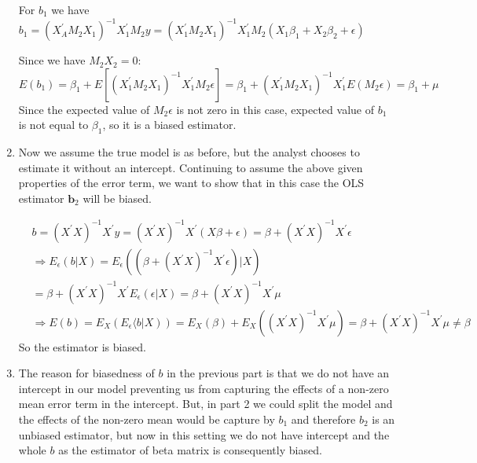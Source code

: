 \documentclass[11pt,reqno]{article}   %
\newcommand{\kt}{^{\prime}}
\begin{document}
\begin{enumerate}
For $b_1$ we have $b_{1}=\left(X_{A}^{\prime} M_{2} X_{1}\right)^{-1} X_{1}^{\prime} M_{2} y=\left(X_{1}^{\prime} M_{2} X_{1}\right)^{-1} X_{1}^{\prime} M_{2}\left(X_{1} \beta_{1}+X_{2} \beta_{2}+\epsilon\right)$

Since we have $M_2X_2=0$:
$$E\left(b_{1}\right)=\beta_{1}+E\left[\left(X_{1}^{\prime} M_{2} X_{1}\right)^{-1} X_{1}^{\prime} M_{2} \epsilon\right]=\beta_{1}+\left(X_{1}^{\prime} M_{2} X_{1}\right)^{-1} X_{1}^{\prime} E\left(M_{2} \epsilon\right) = \beta_1+\mu$$
Since the expected value of $M_2\epsilon$ is not zero in this case, expected value of $b_1$ is not equal to $\beta_1$, so it is a biased estimator.


\item
Now we assume the true model is as before, but the analyst chooses to estimate it without an intercept. Continuing to assume the above given properties of the error term, we want to show that in this case the OLS estimator $\mathbf{b}_{2}$ will be biased.

\begin{equation}
\begin{split}
&b=\left(X^{\prime} X\right)^{-1} X^{\prime} y=\left(X^{\prime} X\right)^{-1} X^{\prime}(X \beta+\epsilon)=\beta+\left(X^{\prime} X\right)^{-1} X^{\prime} \epsilon\\
&\Rightarrow E_{\epsilon}(b | X)=E_{\epsilon}\left(\left(\beta+\left(X^{\prime} X\right)^{-1} X^{\prime} \epsilon\right) | X\right)\\&=\beta+\left(X^{\prime} X\right)^{-1} X^{\prime} E_{\epsilon}(\epsilon | X)= 
\beta+\left(X^{\prime} X\right)^{-1} X^{\prime} \mu\\
&\left.\Rightarrow E(b)=E_{X}\left(E_{\epsilon}\langle b| X\right)\right)=E_{X}(\beta)+E_{X}\left(\left(X^{\prime} X\right)^{-1} X^{\prime} \mu\right)= \beta+(X\kt X)^{-1}X\kt\mu \neq \beta
\end{split}
\end{equation}
So the estimator is biased.
\item 
The reason for biasedness of $b$ in the previous part is that we do not have an intercept in our model preventing us from capturing the effects of a non-zero mean error term in the intercept. But, in part 2 we could split the model and the effects of the non-zero mean would be capture by $b_1$ and therefore $b_2$ is an unbiased estimator, but now in this setting we do not have intercept and the whole $b$ as the estimator of beta matrix is consequently biased. 

\end{enumerate}
\end{document}
